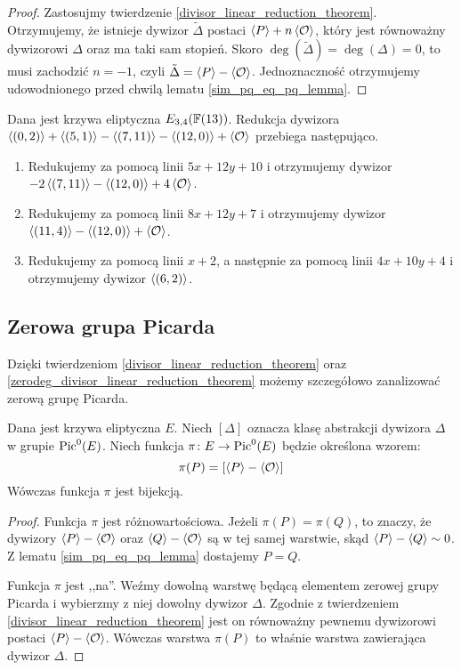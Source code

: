 \begin{proof}
Zastosujmy twierdzenie \ref{divisor_linear_reduction_theorem}.
Otrzymujemy, że istnieje dywizor $\tilde{\Delta}$
postaci $\left\langle P\right\rangle + n\left\langle\mathcal{O}\right\rangle$,
który jest równoważny dywizorowi $\Delta$ oraz ma taki sam stopień.
Skoro $\deg(\tilde{\Delta}) = \deg(\Delta) = 0$,
to musi zachodzić $n = -1$, czyli $\tilde{\Delta} = \left\langle P\right\rangle - \left\langle\mathcal{O}\right\rangle$.
Jednoznaczność otrzymujemy udowodnionego przed chwilą lematu
\ref{sim_pq_eq_pq_lemma}.
\end{proof}

\begin{example}
Dana jest krzywa eliptyczna $E_{3,4}(\mathbb{F}(13))$.
Redukcja dywizora
$\left\langle(0,2)\right\rangle + \left\langle(5,1)\right\rangle - \left\langle(7, 11)\right\rangle - \left\langle(12,0)\right\rangle + \left\langle\mathcal{O}\right\rangle$
przebiega następująco.
\begin{enumerate}
\item
Redukujemy za pomocą linii $5x + 12y + 10$
i otrzymujemy dywizor
$-2\left\langle(7, 11)\right\rangle - \left\langle(12,0)\right\rangle + 4\left\langle\mathcal{O}\right\rangle$.
\item
Redukujemy za pomocą linii $8x + 12y + 7$
i otrzymujemy dywizor
$\left\langle(11,4)\right\rangle - \left\langle(12,0)\right\rangle + \left\langle\mathcal{O}\right\rangle$.
\item
Redukujemy za pomocą linii $x + 2$,
a następnie za pomocą linii $4x + 10y + 4$
i otrzymujemy dywizor
$\left\langle(6,2)\right\rangle$.
\end{enumerate}
\end{example}

\subsection*{Zerowa grupa Picarda}

\noindent
Dzięki twierdzeniom \ref{divisor_linear_reduction_theorem}
oraz \ref{zerodeg_divisor_linear_reduction_theorem}
możemy szczegółowo zanalizować zerową grupę Picarda.

\begin{theorem}\label{piczero_curvepts_bijection_theorem}
Dana jest krzywa eliptyczna $E$.
Niech $[\Delta]$ oznacza klasę abstrakcji dywizora $\Delta$
w grupie $\operatorname{Pic}^0(E)$.
Niech funkcja $\pi\colon E \to \operatorname{Pic}^0(E)$ będzie określona wzorem:
\begin{equation}\label{piczero_bijection_eqn}
\pi(P) = [\left\langle P\right\rangle - \left\langle\mathcal{O}\right\rangle]
\end{equation}
Wówczas funkcja $\pi$ jest bijekcją.
\end{theorem}

\begin{proof}
Funkcja $\pi$ jest różnowartościowa. Jeżeli $\pi(P) = \pi(Q)$,
to znaczy, że dywizory $\left\langle P\right\rangle - \left\langle\mathcal{O}\right\rangle$
oraz $\left\langle Q\right\rangle - \left\langle\mathcal{O}\right\rangle$ są w tej samej warstwie,
skąd $\left\langle P\right\rangle - \left\langle Q\right\rangle \sim 0$.
Z lematu \ref{sim_pq_eq_pq_lemma} dostajemy $P = Q$.

\noindent
Funkcja $\pi$ jest ,,na''. Weźmy dowolną warstwę będącą elementem
zerowej grupy Picarda i wybierzmy z niej dowolny dywizor $\Delta$.
Zgodnie z twierdzeniem \ref{divisor_linear_reduction_theorem}
jest on równoważny pewnemu dywizorowi postaci $\left\langle P\right\rangle - \left\langle\mathcal{O}\right\rangle$.
Wówczas warstwa $\pi(P)$ to właśnie warstwa zawierająca dywizor $\Delta$.
\end{proof}

